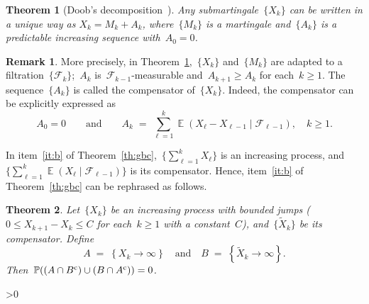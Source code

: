\documentclass[12pt,a4paper]{article}  %
\newcommand{\bibfile}{\jobname.bib}  %
\newcounter{cite}
\newtheorem{theorem}{Theorem}[section]
\theoremstyle{definition}
\newtheorem{remark}{Remark}[section]
\numberwithin{equation}{section}
\newcommand{\FF}{\mathcal{F}}
\newcommand{\comp}{{\textnormal{c}}}
\DeclareMathOperator{\expc}{\mathbb{E}}
\renewcommand{\Pr}{\mathbb{P}}
\begin{document}
\begin{theorem}[Doob's decomposition~\mbox{\cite[Theorem~4.3.2]{Durrett_2019}}]
    \label{th:doobd}
    Any submartingale~$\{X_k\}$ can be written in a unique way as $X_k = M_k + A_k$,
    where~$\{M_k\}$ is a martingale and~$\{A_k\}$ is a predictable increasing
    sequence with~$A_0 = 0$.
\end{theorem}

\begin{remark}
    \label{rem:doobd}
    More precisely, in Theorem~\ref{th:doobd},~$\{X_k\}$ and~$\{M_k\}$ are adapted to
    a filtration~$\{\FF_k\}$;~$A_k$ is~$\FF_{k-1}$-measurable
    and~$A_{k+1}\ge A_k$ for each~$k\ge 1$. The sequence~$\{A_k\}$ is called the compensator
    of~$\{X_k\}$. Indeed, the compensator can be explicitly expressed as
    \[
        A_0 = 0
        \qquad \text{and} \qquad
        A_k \;=\; \sum_{\ell=1}^k \expc(X_\ell - X_{\ell-1}\mathrel{|}\FF_{\ell-1}), \quad k \ge 1.
    \]
\end{remark}

In item~\ref{it:b} of Theorem~\ref{th:gbc},~$\{\sum_{\ell=1}^k X_\ell\}$ is an increasing process, and $\{\sum_{\ell=1}
^k \expc(X_\ell\mathrel{|}\FF_{\ell-1})\}$ is its compensator.
Hence, item~\ref{it:b} of Theorem~\ref{th:gbc} can be rephrased as follows.

\begin{theorem}
    \label{th:ipbj}
    Let~$\{X_k\}$ be an increasing process with bounded jumps
    \textnormal{(}$0\le X_{k+1} - X_k \le C$ for each~$k\ge 1$ with a constant~$C$\textnormal{)},
    and~$\{\tilde{X}_k\}$ be its compensator.
    Define
\[
    A \;=\; \left\{ X_k \to \infty \right\}
    \quad \text{and} \quad
    B \;=\;  \left\{\tilde{X}_k \to  \infty \right\}.
\]
      Then~$\Pr((A\cap B^{\comp}) \cup (B\cap A^{\comp})) = 0$.

\end{theorem}


\ifnum\value{cite}>0
    \small
    
    
\fi

\end{document}
